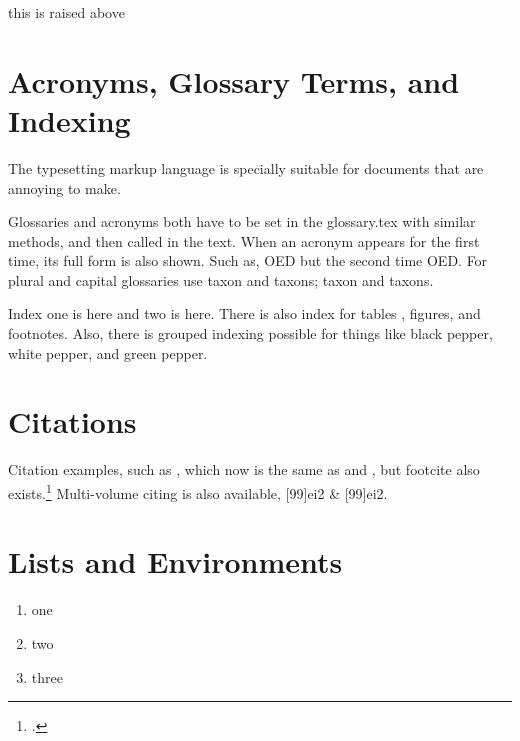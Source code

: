 \noindent{\color{black}\rule[1.5ex]{0.25\linewidth}{0.2mm}} this is raised above

\clearpage

\section{Acronyms, Glossary Terms, and Indexing}

The  typesetting markup language is specially suitable for documents that are annoying to make.

\bigskip

Glossaries and acronyms both have to be set in the glossary.tex with similar methods, and then called in the text. When an acronym appears for the first time, its full form is also shown. Such as, \gls{OED} but the second time \gls{OED}. For plural and capital glossaries use \gls{taxon} and \glspl{taxon}; \Gls{taxon} and \Glspl{taxon}.

Index one is here and  two is here. There is also index for tables , figures, and footnotes.
Also, there is grouped indexing possible for things like black pepper, white pepper, and green pepper. 


\section{Citations}

Citation examples, such as \autocite[99]{laufer_sino-iranica_1919}, which now is the same as \parencite[99]{laufer_sino-iranica_1919} and \textcite{laufer_sino-iranica_1919}, but footcite also exists.\footcite{laufer_sino-iranica_1919} 
Multi-volume citing is also available, [99]{ei2} \& [99]{ei2}.

\section{Lists and Environments}
\label{sec:environments}

\begin{enumerate}
    \item one
    \item two
    \item three
\end{enumerate}

